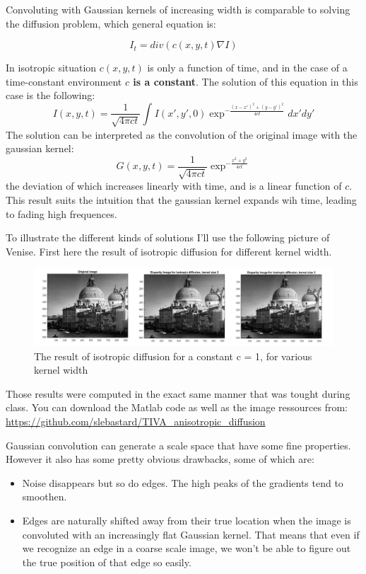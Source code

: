 \documentclass[12pt,a4paper]{article}
\begin{document}
Convoluting with Gaussian kernels of increasing width is comparable to solving the diffusion problem, which general equation is:

\begin{equation}
I_{t} = div(c(x,y,t) \nabla I)
\end{equation}

In isotropic situation $c(x,y,t)$ is only a function of time, and in the case of a time-constant environment \textbf{$c$ is a constant}.
The solution of this equation in this case is the following:
\begin{equation}
I(x,y,t)=\frac{1}{\sqrt{4 \pi c t}}\int_{ }^{ } I(x',y',0)\exp^{-\frac{(x-x')^{2} + (y-y')^{2}}{4ct}}dx'dy'
\end{equation}
The solution can be interpreted as the convolution of the original image with the gaussian kernel:
\begin{equation}
G(x,y,t)=\frac{1}{\sqrt{4 \pi c t}}\exp^{-\frac{x^{2} + y^{2}}{4ct}}
\end{equation}
the deviation of which increases linearly with time, and is a linear function of $c$.
This result suits the intuition that the gaussian kernel expands wih time, leading to fading high frequences.


To illustrate the different kinds of solutions I'll use the following picture of Venise. First here the result of isotropic diffusion for different kernel width.
\begin{figure}[h]
	\centering
	\includegraphics[scale=0.6]{isotropic_diffusion.jpg}
	\caption{The result of isotropic diffusion for a constant c = 1, for various kernel width}
\end{figure}
Those results were computed in the exact same manner that was tought during class. You can download the Matlab code as well as the image ressources from:
\url{https://github.com/slebastard/TIVA\_anisotropic\_diffusion}

Gaussian convolution can generate a scale space that have some fine properties. However it also has some pretty obvious drawbacks, some of which are:
\begin{itemize}
	\item Noise disappears but so do edges. The high peaks of the gradients tend to smoothen.
	\item Edges are naturally shifted away from their true location when the image is convoluted with an increasingly flat Gaussian kernel. That means that even if we recognize an edge in a coarse scale image, we won't be able to figure out the true position of that edge so easily.
\end{itemize}
\end{document}
